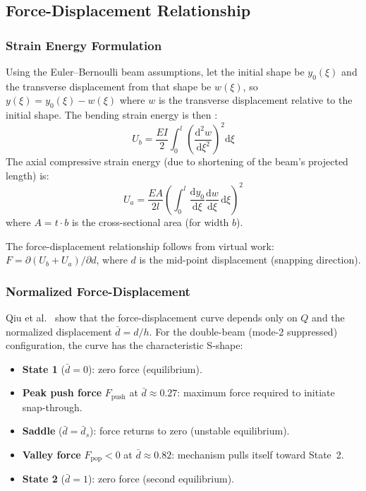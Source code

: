 \documentclass[11pt,letterpaper]{article}
\newcommand{\diff}{\mathrm{d}}
\begin{document}
\subsection{Force-Displacement Relationship}
\label{ssec:FD}

\subsubsection{Strain Energy Formulation}

Using the Euler--Bernoulli beam assumptions, let the initial shape be
$y_0(\xi)$ and the transverse displacement from that shape be $w(\xi)$, so
$y(\xi) = y_0(\xi) - w(\xi)$ where $w$ is the transverse displacement
relative to the initial shape. The bending strain energy is then
\cite{qiu2004}:
\begin{equation}
  U_b = \frac{EI}{2}\int_0^l \left(\frac{\diff^2 w}{\diff\xi^2}\right)^2\diff\xi
  \label{eq:Ub}
\end{equation}
The axial compressive strain energy (due to shortening of the beam's projected
length) is:
\begin{equation}
  U_a = \frac{EA}{2l}\left(\int_0^l \frac{\diff y_0}{\diff\xi}
        \frac{\diff w}{\diff\xi}\,\diff\xi\right)^2
  \label{eq:Ua}
\end{equation}
where $A = t\cdot b$ is the cross-sectional area (for width $b$).

The force-displacement relationship follows from virtual work:
$F = \partial(U_b + U_a)/\partial d$, where $d$ is the mid-point displacement
(snapping direction).

\subsubsection{Normalized Force-Displacement}

Qiu et al.~\cite{qiu2004} show that the force-displacement curve depends
only on $Q$ and the normalized displacement $\bar{d} = d/h$. For the
double-beam (mode-2 suppressed) configuration, the curve has the
characteristic S-shape:
\begin{itemize}[nosep]
  \item \textbf{State 1} ($\bar{d} = 0$): zero force (equilibrium).
  \item \textbf{Peak push force} $F_{\mathrm{push}}$ at $\bar{d} \approx 0.27$:
    maximum force required to initiate snap-through.
  \item \textbf{Saddle} ($\bar{d} = \bar{d}_s$): force returns to zero
    (unstable equilibrium).
  \item \textbf{Valley force} $F_{\mathrm{pop}} < 0$ at $\bar{d} \approx 0.82$:
    mechanism pulls itself toward State~2.
  \item \textbf{State 2} ($\bar{d} = 1$): zero force (second equilibrium).
\end{itemize}
\end{document}
